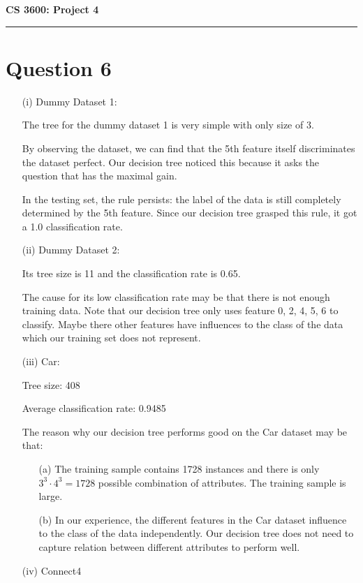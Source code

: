 \documentclass[letterpaper]{article}
\begin{document}
\textbf{CS 3600: Project 4}
\par\noindent\rule{\textwidth}{0.4pt}
\section*{Question 6}
\begin{enumerate}
	\item [(i)]
	Dummy Dataset 1:
	
	The tree for the dummy dataset 1 is very simple with only size of 3.
	
	By observing the dataset, we can find that the 5th feature itself discriminates the dataset perfect. Our decision tree noticed this because it asks the question that has the maximal gain.
	
	In the testing set, the rule persists: the label of the data is still completely determined by the 5th feature. Since our decision tree grasped this rule, it got a 1.0 classification rate.
	
	\item [(ii)]
	Dummy Dataset 2:
	
	Its tree size is 11 and the classification rate is 0.65. 
	
	The cause for its low classification rate may be that there is not enough training data. Note that our decision tree only uses feature 0, 2, 4, 5, 6 to classify. Maybe there other features have influences to the class of the data which our training set does not represent.
	
	\item [(iii)]
	Car:
	
	Tree size: 408
	
	Average classification rate: 0.9485
	
	The reason why our decision tree performs good on the Car dataset may be that:
	
	\begin{enumerate}
		\item [(a)]
		The training sample contains 1728 instances and there is only $3^3\cdot 4^3=1728$ possible combination of attributes. The training sample is large.
		\item [(b)]
		In our experience, the different features in the Car dataset influence to the class of the data independently. Our decision tree does not need to capture relation between different attributes to perform well.
	\end{enumerate}
	
	\item [(iv)]
	Connect4
	

\end{enumerate}
\end{document}
